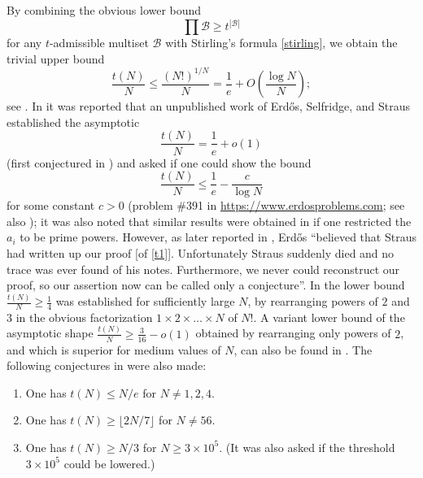 \documentclass[12pt,a4paper,reqno]{amsart}
\numberwithin{equation}{section}
\theoremstyle{plain}
\theoremstyle{definition}
\newcommand\tuple{{\mathcal B}}
\begin{document}
By combining the obvious lower bound
\begin{equation}\label{obvious}
 \prod \tuple \geq t^{|\tuple|}
\end{equation}
for any $t$-admissible multiset $\tuple$ with Stirling's formula \eqref{stirling}, we obtain the trivial upper bound
\begin{equation}\label{trivial} \frac{t(N)}{N} \leq \frac{(N!)^{1/N}}{N} = \frac{1}{e} + O\left( \frac{\log N}{N}\right);
\end{equation}
see .  In \cite[p.75]{erdos-graham} it was reported that an unpublished work of Erd\H{o}s, Selfridge, and Straus established the asymptotic
\begin{equation}\label{t1}
  \frac{t(N)}{N} = \frac{1}{e} + o(1)
\end{equation}
(first conjectured in \cite{erdos-71}) and asked if one could show the bound
\begin{equation}\label{Tbound}
   \frac{t(N)}{N} \leq \frac{1}{e} - \frac{c}{\log N}
\end{equation}
for some constant $c>0$ (problem {\#}391 in \url{https://www.erdosproblems.com}; see also \cite[Section B22, p. 122--123]{guy}); it was also noted that similar results were obtained in \cite{algr77} if one restricted the $a_i$ to be prime powers.  However, as later reported in \cite{erdos-96}, Erd\H{o}s ``believed that Straus had written up our proof [of \eqref{t1}]. Unfortunately Straus suddenly died and no trace was ever found of his notes. Furthermore, we never could reconstruct our proof, so our assertion now can be called only a conjecture''.   In \cite{guy} the lower bound $\frac{t(N)}{N} \geq \frac{1}{4}$ was established for sufficiently large $N$, by rearranging powers of $2$ and $3$ in the obvious factorization $1 \times 2 \times \dots \times N$ of $N!$.  A variant lower bound of the asymptotic shape $\frac{t(N)}{N} \geq \frac{3}{16}-o(1)$ obtained by rearranging only powers of $2$, and which is superior for medium values of $N$, can also be found in \cite{guy}.  The following conjectures in \cite{guy} were also made:
\begin{enumerate}
\item One has $t(N) \leq N/e$ for $N \neq 1,2,4$.
\item One has $t(N) \geq \lfloor 2N/7 \rfloor$ for $N \neq 56$.
\item One has $t(N) \geq N/3$ for $N \geq 3 \times 10^5$.  (It was also asked if the threshold $3 \times 10^5$ could be lowered.) 
\end{enumerate}
\end{document}
